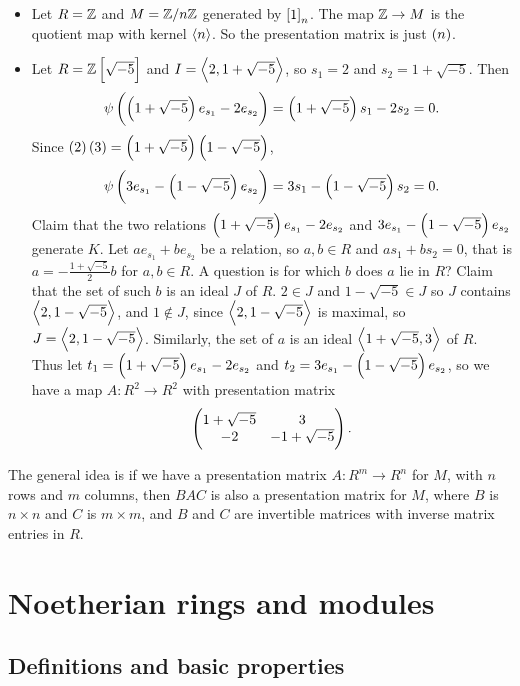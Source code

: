 \begin{example*}
\hfill
\begin{itemize}
\item Let $ R = \mathbb{Z} $ and $ M = \mathbb{Z} / n\mathbb{Z} $ generated by $ \sbr{1}_n $. The map $ \mathbb{Z} \to M $ is the quotient map with kernel $ \left\langle n \right\rangle $. So the presentation matrix is just $ \br{n} $.
\item Let $ R = \ZZ\sbr{\sqrt{-5}} $ and $ I = \left\langle 2, 1 + \sqrt{-5} \right\rangle $, so $ s_1 = 2 $ and $ s_2 = 1 + \sqrt{-5} $. Then
$$ \psi\br{\br{1 + \sqrt{-5}}e_{s_1} - 2e_{s_2}} = \br{1 + \sqrt{-5}}s_1 - 2s_2 = 0. $$
Since $ \br{2}\br{3} = \br{1 + \sqrt{-5}}\br{1 - \sqrt{-5}} $,
$$ \psi\br{3e_{s_1} - \br{1 - \sqrt{-5}}e_{s_2}} = 3s_1 - \br{1 - \sqrt{-5}}s_2 = 0. $$
Claim that the two relations $ \br{1 + \sqrt{-5}}e_{s_1} - 2e_{s_2} $ and $ 3e_{s_1} - \br{1 - \sqrt{-5}}e_{s_2} $ generate $ K $. Let $ ae_{s_1} + be_{s_2} $ be a relation, so $ a, b \in R $ and $ as_1 + bs_2 = 0 $, that is $ a = -\tfrac{1 + \sqrt{-5}}{2}b $ for $ a, b \in R $. A question is for which $ b $ does $ a $ lie in $ R $? Claim that the set of such $ b $ is an ideal $ J $ of $ R $. $ 2 \in J $ and $ 1 - \sqrt{-5} \in J $ so $ J $ contains $ \left\langle 2, 1 - \sqrt{-5} \right\rangle $, and $ 1 \notin J $, since $ \left\langle 2, 1 - \sqrt{-5} \right\rangle $ is maximal, so $ J = \left\langle 2, 1 - \sqrt{-5} \right\rangle $. Similarly, the set of $ a $ is an ideal $ \left\langle 1 + \sqrt{-5}, 3 \right\rangle $ of $ R $. Thus let $ t_1 = \br{1 + \sqrt{-5}}e_{s_1} - 2e_{s_2} $ and $ t_2 = 3e_{s_1} - \br{1 - \sqrt{-5}}e_{s_2} $, so we have a map $ A : R^2 \to R^2 $ with presentation matrix
$$ \begin{pmatrix} 1 + \sqrt{-5} & 3 \\ -2 & -1 + \sqrt{-5} \end{pmatrix}. $$
\end{itemize}
\end{example*}

The general idea is if we have a presentation matrix $ A : R^m \to R^n $ for $ M $, with $ n $ rows and $ m $ columns, then $ BAC $ is also a presentation matrix for $ M $, where $ B $ is $ n \times n $ and $ C $ is $ m \times m $, and $ B $ and $ C $ are invertible matrices with inverse matrix entries in $ R $.

\pagebreak

\section{Noetherian rings and modules}

\subsection{Definitions and basic properties}

